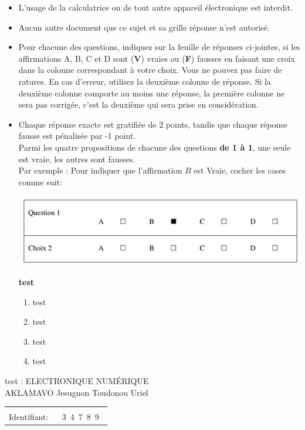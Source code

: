 \documentclass{book}%
\begin{document}
\begin{itemize}%
\item%
L'usage de la calculatrice ou de tout autre appareil électronique est interdit.%
\item%
Aucun autre document que ce sujet et sa grille réponse n'est autorisé.%
\item%
Pour chacune des questions, indiquez sur la feuille de réponses ci-jointes, si les affirmations A, B, C et D sont (\textbf{V}) vraies ou (\textbf{F}) fausses en faisant une croix dans la colonne correspondant à votre choix. Vous ne pouvez pas faire de ratures. En cas d'erreur, utilisez la deuxième colonne de réponse. Si la deuxième colonne comporte au moins une réponse, la première colonne ne sera pas corrigée, c'est la deuxième qui sera prise en considération.%
\item%
Chaque réponse exacte est gratifiée de 2 points, tandis que chaque réponse fausse est pénalisée par -1 point. \\ 	Parmi les quatre propositions de chacune des questions \textbf{de 1 à 1}, une seule est vraie, les autres sont fausses. \\ 	Par exemple : Pour indiquer que l'affirmation $B$ est Vraie, cocher les cases comme suit:  \\ \begin{center}	\includegraphics[scale=0.8]{reponses.png} \end{center}%
\thispagestyle{empty}%
\begin{exercise}%
\textbf{test }%
\begin{enumerate}[label=\textbf{\Alph*. }]%
\item%
test%
\item%
test%
\item%
test%
\item%
test%
\end{enumerate}%
\end{exercise}%
\end{itemize}%
\newpage%
\thispagestyle{empty}%
test : ELECTRONIQUE NUMÉRIQUE $\qquad \qquad \qquad \qquad \qquad \qquad \qquad \qquad$ AKLAMAVO Jesugnon Toudonou Uriel%
\begin{flushright}%
\begin{tabular}{|l|}%
\hline%
 \\%
\thispagestyle{empty}%
Identifiant: $\quad$ {\Large 3~4~7~8~9~}%
 \\%
\hline%
\end{tabular}%
\end{flushright}%
\end{document}
